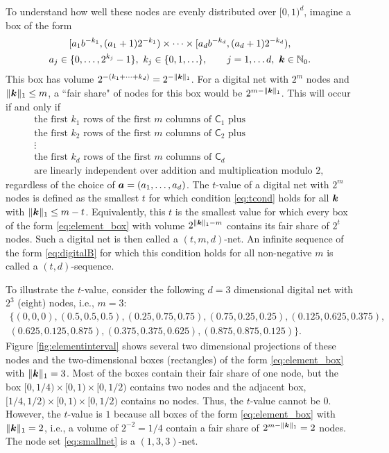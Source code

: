 \documentclass{svproc}
\begin{document}
To understand how well these nodes are evenly distributed over $[0,1)^d$, imagine a box of the form
\begin{multline} \label{eq:element_box}
	[a_1 b^{-k_1}, (a_1 + 1) 2^{-k_1}) \times \cdots \times [a_d b^{-k_d}, (a_d + 1) 2^{-k_d}), \\
	a_j \in \{0, \ldots, 2^{k_j} - 1\}, \ k_j \in \{0,1, \ldots \}, \qquad j =1, \ldots d, \ {\boldsymbol{k}} \in {\mathbb{N}}_0.
\end{multline}
This box has volume $2^{-(k_1 + \cdots +k_d)} = 2^{-\lVert{\boldsymbol{k}}\rVert_1}$.  For a digital net with $2^m$ nodes and $\lVert {\boldsymbol{k}} \rVert_1 \le m$, a ``fair share" of nodes for this box would be $2^{m- \lVert {\boldsymbol{k}} \rVert_1}$.  This will occur if and only if
\begin{multline} \label{eq:tcond}
	\text{the first $k_1$ rows of the first $m$ columns of $\mathsf{C}_1$ plus} \\
	\text{the first $k_2$ rows of the first $m$ columns of $\mathsf{C}_2$ plus} \\
	 \vdots \\
	\text{the first $k_d$ rows of the first $m$ columns of $\mathsf{C}_d$} \\
	\text{are linearly independent over addition and multiplication modulo $2$, }
\end{multline}
regardless of the choice of ${\boldsymbol{a}} = (a_1, \ldots, a_d)$.  The $t$-value of a digital net with $2^m$ nodes is defined as the smallest $t$ for which condition \eqref{eq:tcond} holds for all ${\boldsymbol{k}}$ with $\lVert {\boldsymbol{k}} \rVert_1 \le m-t$.  Equivalently, this $t$ is the smallest value for which every box of the form \eqref{eq:element_box} with volume $2^{\lVert {\boldsymbol{k}} \rVert_1 - m}$ contains its fair share of $2^t$ nodes.  Such a digital net is then called a $(t,m,d)$-net.  An infinite sequence of the form \eqref{eq:digitalB} for which this condition holds for all non-negative $m$ is called a  $(t,d)$-sequence.

To illustrate the $t$-value, consider the following $d=3$ dimensional digital net with $2^3$ (eight) nodes, i.e., $m = 3$:
\begin{multline} \label{eq:smallnet}
	\{(0, 0,   0),
	(0.5,   0.5,   0.5  ),
	(0.25,  0.75,  0.75 ),
	(0.75,  0.25,  0.25 ),
	(0.125, 0.625, 0.375),\\
	(0.625, 0.125, 0.875),
	(0.375, 0.375, 0.625),
	(0.875, 0.875, 0.125)\}.
\end{multline}
Figure \ref{fig:elementinterval} shows several two dimensional projections of these nodes and the two-dimensional boxes (rectangles) of the form \eqref{eq:element_box} with $\lVert{\boldsymbol{k}}\rVert_1 = 3$.  Most of the boxes contain their fair share of one node, but the box $[0,1/4) \times [0,1) \times [0,1/2)$ contains two nodes and the adjacent box, $[1/4,1/2) \times [0,1) \times [0,1/2)$ contains no nodes.  Thus, the $t$-value cannot be $0$.  However, the $t$-value is $1$ because all boxes of the form  \eqref{eq:element_box} with $\lVert{\boldsymbol{k}}\rVert_1 = 2$, i.e., a volume of $2^{-2} = 1/4$ contain a fair share of $2^{m- \lVert {\boldsymbol{k}} \rVert_1} = 2$ nodes.  The node set \eqref{eq:smallnet} is a $(1,3,3)$-net.
\end{document}
